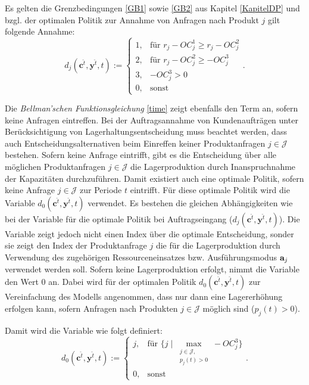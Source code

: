 Es gelten die Grenzbedingungen \eqref{GB1} sowie \eqref{GB2} aus Kapitel \ref{KapitelDP} und bzgl. der optimalen Politik zur Annahme von Anfragen nach Produkt $j$ gilt folgende Annahme:
\begin{equation}\label{GB3}
     d_{j}({\textbf{c}^{\hat t},\textbf{y}^{\hat t}, t}):=\left\{\begin{array}{llll}
     1, & \text{für } r_{j} - OC_{j}^{1} \ge r_{j} - OC_{j}^{2}\\
         2, & \text{für } r_{j} - OC_{j}^{2} \ge -OC_{j}^{3}\\
         3, & -OC_{j}^{3} > 0\\
         0, & \text{sonst}\end{array}\right. .
\end{equation}

Die \textit{Bellman'schen Funktionsgleichung} \eqref{time} zeigt ebenfalls den Term an, sofern keine Anfragen eintreffen. Bei der Auftragsannahme von Kundenaufträgen unter Berücksichtigung von Lagerhaltungsentscheidung muss beachtet werden, dass auch Entscheidungsalternativen beim Einreffen keiner Produktanfragen $j\in\mathcal{J} $ bestehen. Sofern keine Anfrage eintrifft, gibt es die Entscheidung über alle möglichen Produktanfragen $j\in\mathcal{J}$ die Lagerproduktion durch Inanspruchnahme der Kapazitäten durchzuführen. Damit existiert auch eine optimale Politik, sofern keine Anfrage $j\in\mathcal{J}$ zur Periode $t$ eintrifft. Für diese optimale Politik wird die Variable $d_0({\textbf{c}^{\hat t},\textbf{y}^{\hat t},t})$ verwendet. Es bestehen die gleichen Abhängigkeiten wie bei der Variable für die optimale Politik bei Auftragseingang ($d_j({\textbf{c}^{\hat t},\textbf{y}^{\hat t},t})$). Die Variable zeigt jedoch nicht einen Index über die optimale Entscheidung, sonder sie zeigt den Index der Produktanfrage $j$ die für die Lagerproduktion durch Verwendung des zugehörigen Ressourceneinsatzes bzw. Ausführungsmodus $\textbf a_j$ verwendet werden soll. Sofern keine Lagerproduktion erfolgt, nimmt die Variable den Wert $0$ an. Dabei wird für der optimalen Politik $d_0({\textbf{c}^{\hat t},\textbf{y}^{\hat t},t})$ zur Vereinfachung des Modells angenommen, dass nur dann eine Lagererhöhung erfolgen kann, sofern Anfragen nach Produkten $j\in\mathcal J$ möglich sind ($p_j(t)>0$).

Damit wird die Variable wie folgt definiert:
\begin{equation}\label{GB4}
     d_{0}({\textbf{c}^{\hat t},\textbf{y}^{\hat t}, t}):=\left\{\begin{array}{ll}
         j, & \text{für }\{ j\; |\; \max_{\substack{j\in \mathcal{J},\\ p_j(t)>0}} -OC_{j}^{3}\}\\
         0, & \text{sonst}\end{array}\right. .
\end{equation}




